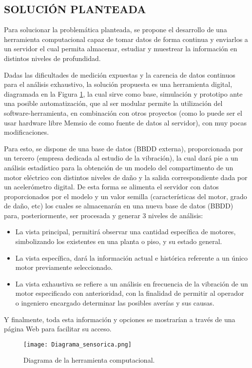 \subsection{SOLUCIÓN PLANTEADA}

Para solucionar la problemática planteada, se propone el desarrollo de una
herramienta computacional capaz de tomar datos de forma continua y enviarlos  a
un servidor el cual permita  almacenar, estudiar y muestrear la información en
distintos niveles de profundidad.

Dadas las dificultades de medición expuestas y la carencia de datos continuos
para el análisis exhaustivo, la solución propuesta es una herramienta digital,
diagramada en la Figura \ref{diagrama}, la cual sirve como base, simulación y
prototipo ante  una posible automatización, que al ser modular permite la
utilización del software-herramienta, en combinación con otros proyectos (como
lo puede ser el usar hardware libre Memsio de \textcite{Koene} como fuente de
datos al servidor), con muy pocas modificaciones.

Para esto, se dispone de una base de datos (BBDD externa), proporcionada por un
tercero (empresa dedicada al estudio de la vibración), la cual dará pie a un
análisis estadístico para la obtención de un modelo del compartimento de un
motor eléctrico con distintos niveles de daño y la salida correspondiente dada
por un acelerómetro digital. De esta forma se alimenta el servidor con datos
proporcionados por el modelo y un valor semilla (características del motor,
grado de daño, etc) los cuales se almacenarán en una nueva base de datos (BBDD)
para, posteriormente, ser procesada y  generar 3 niveles de análisis:


\begin{itemize}

\item La vista principal, permitirá observar una cantidad específica de
motores, simbolizando los existentes en una planta o piso, y su estado general.

\item La vista específica, dará la información actual e histórica referente a
un único motor previamente seleccionado.

\item La vista exhaustiva se refiere a un análisis en frecuencia de la
vibración de un motor especificado con anterioridad, con la finalidad de
permitir al operador o ingeniero encargado determinar las posibles
averías y sus causas.

\end{itemize}

Y finalmente, toda esta información y opciones se mostrarían a través de una
página Web para facilitar su acceso.

\begin{figure}[htb]
\centering
\caption{Diagrama de la herramienta computacional.}
\label{diagrama}
\texttt{[image: Diagrama\_sensorica.png]}
\end{figure}

